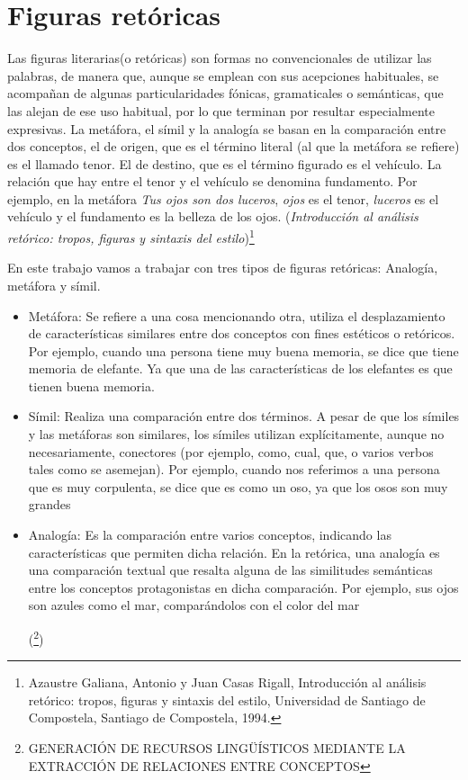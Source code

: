 \section{Figuras retóricas}
Las figuras literarias(o retóricas) son formas no convencionales de utilizar las palabras, de manera que, aunque se emplean con sus acepciones habituales, se acompañan de algunas particularidades fónicas, gramaticales o semánticas, que las alejan de ese uso habitual, por lo que terminan por resultar especialmente expresivas. 
La metáfora, el símil y la analogía se basan en la comparación entre dos conceptos, el de origen, que es el término literal (al que la metáfora se refiere) es el llamado tenor. El de destino, que es el término figurado es el vehículo. La relación que hay entre el tenor y el vehículo se denomina fundamento. Por ejemplo, en la metáfora \textit{Tus ojos son dos luceros}, \textit{ojos} es el tenor, \textit{luceros} es el vehículo y el fundamento es la belleza de los ojos.
(\textit {Introducción al análisis retórico: tropos, figuras y sintaxis del estilo})\footnote{Azaustre Galiana, Antonio y Juan Casas Rigall, Introducción al análisis retórico: tropos, figuras y sintaxis del estilo, Universidad de Santiago de Compostela, Santiago de Compostela, 1994.}

En este trabajo vamos a trabajar con tres tipos de figuras retóricas: Analogía, metáfora y símil.
\begin{itemize}
	\item Metáfora: Se refiere a una cosa mencionando otra, utiliza el desplazamiento de características similares entre dos conceptos con fines estéticos o retóricos. Por ejemplo, cuando una persona tiene muy buena memoria, se dice que tiene memoria de elefante. Ya que una de las características de los elefantes es que tienen buena memoria.
	
	\item Símil: Realiza una comparación entre dos términos. A pesar de que los símiles y las metáforas son similares, los símiles utilizan explícitamente, aunque no necesariamente, conectores (por ejemplo, como, cual, que, o varios verbos tales como se asemejan).
	Por ejemplo, cuando nos referimos a una persona que es muy corpulenta, se dice que es como un oso, ya que los osos son muy grandes
	
	\item Analogía: Es la comparación entre varios conceptos, indicando las características que permiten dicha relación. En la retórica, una analogía es una comparación textual que resalta alguna de las similitudes semánticas entre los conceptos protagonistas en dicha comparación. Por ejemplo, sus ojos son azules como el mar, comparándolos con el color del mar
	
	(\footnote {GENERACIÓN DE RECURSOS LINGÜÍSTICOS MEDIANTE LA EXTRACCIÓN DE RELACIONES ENTRE CONCEPTOS})	
	
\end{itemize}

